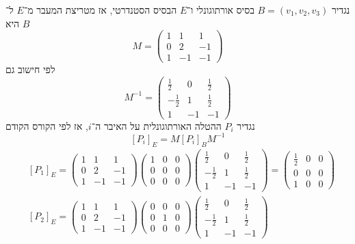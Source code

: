 נגדיר $B = (v_1, v_2, v_3)$ בסיס אורתוגונלי ו־$E$ הבסיס הסטנדרטי, אז מטריצת המעבר מ־$E$ ל־$B$ היא
\[
	M = \begin{pmatrix}
		1 & 1 & 1 \\
		0 & 2 & -1 \\
		1 & -1 & -1
	\end{pmatrix}
\]
לפי חישוב גם
\[
	M^{-1} = \begin{pmatrix}
		\frac{1}{2} & 0 & \frac{1}{2} \\
		-\frac{1}{2} & 1 & \frac{1}{2} \\
		1 & -1 & -1
	\end{pmatrix}
\]
נגדיר $P_i$ ההטלה האורתוגונלית על האיבר ה־$i$, אז לפי הקורס הקודם
\[
	{[P_i]}_E = M {[P_i]}_B M^{-1}
\]
\begin{align*}
	& {[P_1]}_E = 
	\begin{pmatrix}
		1 & 1 & 1 \\
		0 & 2 & -1 \\
		1 & -1 & -1
	\end{pmatrix}
	\begin{pmatrix}
		1 & 0 & 0 \\ 
		0 & 0 & 0 \\ 
		0 & 0 & 0
	\end{pmatrix}
	\begin{pmatrix}
		\frac{1}{2} & 0 & \frac{1}{2} \\
		-\frac{1}{2} & 1 & \frac{1}{2} \\
		1 & -1 & -1
	\end{pmatrix}
	= \begin{pmatrix}
		\frac{1}{2} & 0 & 0 \\
		0 & 0 & 0 \\
		1 & 0 & 0
	\end{pmatrix} \\
	& {[P_2]}_E = 
	\begin{pmatrix}
		1 & 1 & 1 \\
		0 & 2 & -1 \\
		1 & -1 & -1
	\end{pmatrix}
	\begin{pmatrix}
		0 & 0 & 0 \\ 
		0 & 1 & 0 \\ 
		0 & 0 & 0
	\end{pmatrix}
	\begin{pmatrix}
		\frac{1}{2} & 0 & \frac{1}{2} \\
		-\frac{1}{2} & 1 & \frac{1}{2} \\
		1 & -1 & -1
	\end{pmatrix}

\end{align*}
